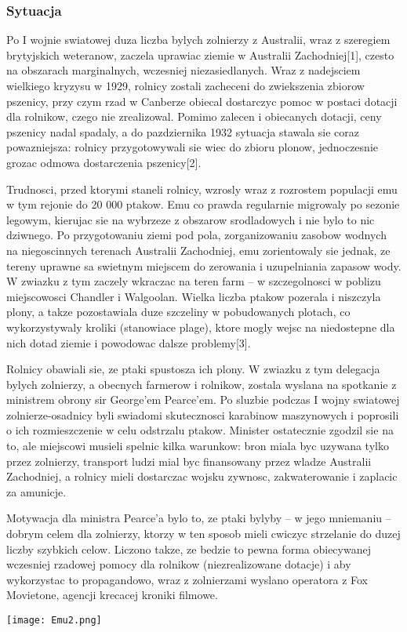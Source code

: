 \documentclass{beamer}
\begin{document}
\begin{frame}
\frametitle{Sytuacja}
Po I wojnie swiatowej duza liczba bylych zolnierzy z Australii, wraz z szeregiem brytyjskich weteranow, zaczela uprawiac ziemie w Australii Zachodniej[1], czesto na obszarach marginalnych, wczesniej niezasiedlanych. Wraz z nadejsciem wielkiego kryzysu w 1929, rolnicy zostali zacheceni do zwiekszenia zbiorow pszenicy, przy czym rzad w Canberze obiecal dostarczyc pomoc w postaci dotacji dla rolnikow, czego nie zrealizowal. Pomimo zalecen i obiecanych dotacji, ceny pszenicy nadal spadaly, a do pazdziernika 1932 sytuacja stawala sie coraz powazniejsza: rolnicy przygotowywali sie wiec do zbioru plonow, jednoczesnie grozac odmowa dostarczenia pszenicy[2].
\end{frame}
\begin{frame}
Trudnosci, przed ktorymi staneli rolnicy, wzrosly wraz z rozrostem populacji emu w tym rejonie do 20 000 ptakow. Emu co prawda regularnie migrowaly po sezonie legowym, kierujac sie na wybrzeze z obszarow srodladowych i nie bylo to nic dziwnego. Po przygotowaniu ziemi pod pola, zorganizowaniu zasobow wodnych na niegoscinnych terenach Australii Zachodniej, emu zorientowaly sie jednak, ze tereny uprawne sa swietnym miejscem do zerowania i uzupelniania zapasow wody. W zwiazku z tym zaczely wkraczac na teren farm – w szczegolnosci w poblizu miejscowosci Chandler i Walgoolan. Wielka liczba ptakow pozerala i niszczyla plony, a takze pozostawiala duze szczeliny w pobudowanych plotach, co wykorzystywaly kroliki (stanowiace plage), ktore mogly wejsc na niedostepne dla nich dotad ziemie i powodowac dalsze problemy[3].
\end{frame}
\begin{frame}
Rolnicy obawiali sie, ze ptaki spustosza ich plony. W zwiazku z tym delegacja bylych zolnierzy, a obecnych farmerow i rolnikow, zostala wyslana na spotkanie z ministrem obrony sir George'em Pearce'em. Po sluzbie podczas I wojny swiatowej zolnierze-osadnicy byli swiadomi skutecznosci karabinow maszynowych i poprosili o ich rozmieszczenie w celu odstrzalu ptakow. Minister ostatecznie zgodzil sie na to, ale miejscowi musieli spelnic kilka warunkow: bron miala byc uzywana tylko przez zolnierzy, transport ludzi mial byc finansowany przez wladze Australii Zachodniej, a rolnicy mieli dostarczac wojsku zywnosc, zakwaterowanie i zaplacic za amunicje. 
\end{frame}
\begin{frame}
Motywacja dla ministra Pearce'a bylo to, ze ptaki bylyby – w jego mniemaniu – dobrym celem dla zolnierzy, ktorzy w ten sposob mieli cwiczyc strzelanie do duzej liczby szybkich celow. Liczono takze, ze bedzie to pewna forma obiecywanej wczesniej rzadowej pomocy dla rolnikow (niezrealizowane dotacje) i aby wykorzystac to propagandowo, wraz z zolnierzami wyslano operatora z Fox Movietone, agencji krecacej kroniki filmowe.

\texttt{[image: Emu2.png]}
\end{frame}
\end{document}
